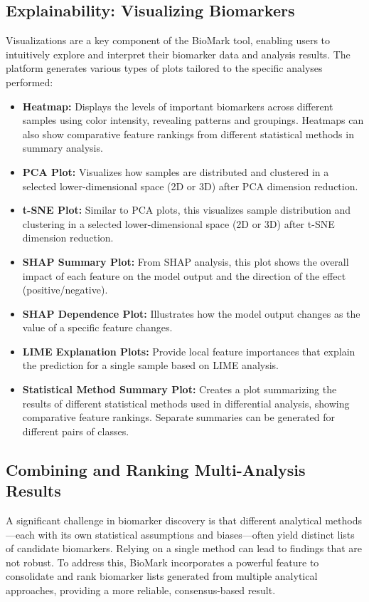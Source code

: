 \documentclass[journal]{IEEEtran}
\begin{document}
\subsection{Explainability: Visualizing Biomarkers}
Visualizations are a key component of the BioMark tool, enabling users to intuitively explore and interpret their biomarker data and analysis results. The platform generates various types of plots tailored to the specific analyses performed:
\begin{itemize}
\item \textbf{Heatmap:} Displays the levels of important biomarkers across different samples using color intensity, revealing patterns and groupings. Heatmaps can also show comparative feature rankings from different statistical methods in summary analysis.
\item \textbf{PCA Plot:} Visualizes how samples are distributed and clustered in a selected lower-dimensional space (2D or 3D) after PCA dimension reduction.
\item \textbf{t-SNE Plot:} Similar to PCA plots, this visualizes sample distribution and clustering in a selected lower-dimensional space (2D or 3D) after t-SNE dimension reduction.
\item \textbf{SHAP Summary Plot:} From SHAP analysis, this plot shows the overall impact of each feature on the model output and the direction of the effect (positive/negative).
\item \textbf{SHAP Dependence Plot:} Illustrates how the model output changes as the value of a specific feature changes.
\item \textbf{LIME Explanation Plots:} Provide local feature importances that explain the prediction for a single sample based on LIME analysis.
\item \textbf{Statistical Method Summary Plot:} Creates a plot summarizing the results of different statistical methods used in differential analysis, showing comparative feature rankings. Separate summaries can be generated for different pairs of classes.
\end{itemize}

\subsection{Combining and Ranking Multi-Analysis Results}
A significant challenge in biomarker discovery is that different analytical methods—each with its own statistical assumptions and biases—often yield distinct lists of candidate biomarkers. Relying on a single method can lead to findings that are not robust. To address this, BioMark incorporates a powerful feature to consolidate and rank biomarker lists generated from multiple analytical approaches, providing a more reliable, consensus-based result.
\end{document}

